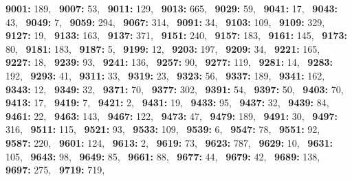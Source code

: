 \textbf{9001:} 189,\allowbreak~ 
\textbf{9007:} 53,\allowbreak~ 
\textbf{9011:} 129,\allowbreak~ 
\textbf{9013:} 665,\allowbreak~ 
\textbf{9029:} 59,\allowbreak~ 
\textbf{9041:} 17,\allowbreak~ 
\textbf{9043:} 43,\allowbreak~ 
\textbf{9049:} 7,\allowbreak~ 
\textbf{9059:} 294,\allowbreak~ 
\textbf{9067:} 314,\allowbreak~ 
\textbf{9091:} 34,\allowbreak~ 
\textbf{9103:} 109,\allowbreak~ 
\textbf{9109:} 329,\allowbreak~ 
\textbf{9127:} 19,\allowbreak~ 
\textbf{9133:} 163,\allowbreak~ 
\textbf{9137:} 371,\allowbreak~ 
\textbf{9151:} 240,\allowbreak~ 
\textbf{9157:} 183,\allowbreak~ 
\textbf{9161:} 145,\allowbreak~ 
\textbf{9173:} 80,\allowbreak~ 
\textbf{9181:} 183,\allowbreak~ 
\textbf{9187:} 5,\allowbreak~ 
\textbf{9199:} 12,\allowbreak~ 
\textbf{9203:} 197,\allowbreak~ 
\textbf{9209:} 34,\allowbreak~ 
\textbf{9221:} 165,\allowbreak~ 
\textbf{9227:} 18,\allowbreak~ 
\textbf{9239:} 93,\allowbreak~ 
\textbf{9241:} 136,\allowbreak~ 
\textbf{9257:} 90,\allowbreak~ 
\textbf{9277:} 119,\allowbreak~ 
\textbf{9281:} 14,\allowbreak~ 
\textbf{9283:} 192,\allowbreak~ 
\textbf{9293:} 41,\allowbreak~ 
\textbf{9311:} 33,\allowbreak~ 
\textbf{9319:} 23,\allowbreak~ 
\textbf{9323:} 56,\allowbreak~ 
\textbf{9337:} 189,\allowbreak~ 
\textbf{9341:} 162,\allowbreak~ 
\textbf{9343:} 12,\allowbreak~ 
\textbf{9349:} 32,\allowbreak~ 
\textbf{9371:} 70,\allowbreak~ 
\textbf{9377:} 302,\allowbreak~ 
\textbf{9391:} 54,\allowbreak~ 
\textbf{9397:} 50,\allowbreak~ 
\textbf{9403:} 70,\allowbreak~ 
\textbf{9413:} 17,\allowbreak~ 
\textbf{9419:} 7,\allowbreak~ 
\textbf{9421:} 2,\allowbreak~ 
\textbf{9431:} 19,\allowbreak~ 
\textbf{9433:} 95,\allowbreak~ 
\textbf{9437:} 32,\allowbreak~ 
\textbf{9439:} 84,\allowbreak~ 
\textbf{9461:} 22,\allowbreak~ 
\textbf{9463:} 143,\allowbreak~ 
\textbf{9467:} 122,\allowbreak~ 
\textbf{9473:} 47,\allowbreak~ 
\textbf{9479:} 189,\allowbreak~ 
\textbf{9491:} 30,\allowbreak~ 
\textbf{9497:} 316,\allowbreak~ 
\textbf{9511:} 115,\allowbreak~ 
\textbf{9521:} 93,\allowbreak~ 
\textbf{9533:} 109,\allowbreak~ 
\textbf{9539:} 6,\allowbreak~ 
\textbf{9547:} 78,\allowbreak~ 
\textbf{9551:} 92,\allowbreak~ 
\textbf{9587:} 220,\allowbreak~ 
\textbf{9601:} 124,\allowbreak~ 
\textbf{9613:} 2,\allowbreak~ 
\textbf{9619:} 73,\allowbreak~ 
\textbf{9623:} 787,\allowbreak~ 
\textbf{9629:} 10,\allowbreak~ 
\textbf{9631:} 105,\allowbreak~ 
\textbf{9643:} 98,\allowbreak~ 
\textbf{9649:} 85,\allowbreak~ 
\textbf{9661:} 88,\allowbreak~ 
\textbf{9677:} 44,\allowbreak~ 
\textbf{9679:} 42,\allowbreak~ 
\textbf{9689:} 138,\allowbreak~ 
\textbf{9697:} 275,\allowbreak~ 
\textbf{9719:} 719,\allowbreak~ 

